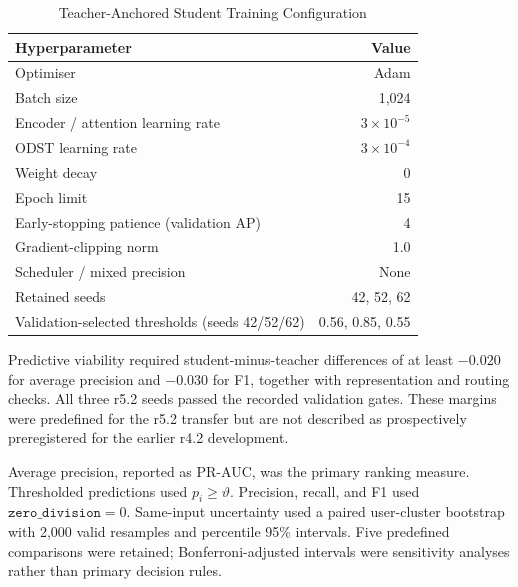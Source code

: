 \begin{table}[!tbp]
\caption{Teacher-Anchored Student Training Configuration}
\label{tab:training_hyperparameters}
\centering
\footnotesize
\renewcommand{\arraystretch}{1.08}
\setlength{\tabcolsep}{2pt}
\begin{tabular*}{\columnwidth}
{@{\extracolsep{\fill}}lr@{}}
\hline
\textbf{Hyperparameter} & \textbf{Value} \\
\hline
Optimiser & Adam \\
Batch size & 1,024 \\
Encoder / attention learning rate & \(3\times10^{-5}\) \\
ODST learning rate & \(3\times10^{-4}\) \\
Weight decay & 0 \\
Epoch limit & 15 \\
Early-stopping patience (validation AP) & 4 \\
Gradient-clipping norm & 1.0 \\
Scheduler / mixed precision & None \\
Retained seeds & 42, 52, 62 \\
Validation-selected thresholds (seeds 42/52/62) & 0.56, 0.85, 0.55 \\
\hline
\end{tabular*}
\end{table}

Predictive viability required student-minus-teacher differences of at least
\(-0.020\) for average precision and \(-0.030\) for F1, together with
representation and routing checks. All three r5.2 seeds passed the recorded
validation gates. These margins were predefined for the r5.2 transfer but
are not described as prospectively preregistered for the earlier r4.2
development.

\smallskip
Average precision, reported as PR-AUC, was the primary ranking measure.
Thresholded predictions used \(p_i\geq\vartheta\). Precision, recall, and
F1 used \(\texttt{zero\_division}=0\). Same-input uncertainty used a paired
user-cluster bootstrap with 2,000 valid resamples and percentile 95\%
intervals. Five predefined comparisons were retained; Bonferroni-adjusted
intervals were sensitivity analyses rather than primary decision rules.

